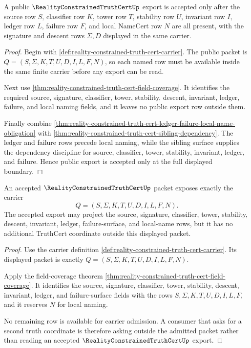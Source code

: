 \begin{theorem}
\label{thm:reality-constrained-truth-cert-public-export-boundary}
A public $\RealityConstrainedTruthCertUp$ export is accepted only after the source row $S$, classifier row $K$, tower row $T$, stability row $U$, invariant row $I$, ledger row $L$, failure row $F$, and local NameCert row $N$ are all present, with the signature and descent rows $\Sigma,D$ displayed in the same carrier.
\end{theorem}
\begin{proof}
Begin with \autoref{def:reality-constrained-truth-cert-carrier}. The public packet is $Q=(S,\Sigma,K,T,U,D,I,L,F,N)$, so each named row must be available inside the same finite carrier before any export can be read.

Next use \autoref{thm:reality-constrained-truth-cert-field-coverage}. It identifies the required source, signature, classifier, tower, stability, descent, invariant, ledger, failure, and local naming fields, and it leaves no public export row outside them.

Finally combine \autoref{thm:reality-constrained-truth-cert-ledger-failure-local-name-obligation} with \autoref{thm:reality-constrained-truth-cert-sibling-dependency}. The ledger and failure rows precede local naming, while the sibling surface supplies the dependency discipline for source, classifier, tower, stability, invariant, ledger, and failure. Hence public export is accepted only at the full displayed boundary.
\end{proof}

\begin{theorem}
\label{thm:reality-constrained-truth-cert-carrier-admission}
An accepted $\RealityConstrainedTruthCertUp$ packet exposes exactly the carrier
$$
Q=(S,\Sigma,K,T,U,D,I,L,F,N).
$$
The accepted export may project the source, signature, classifier, tower,
stability, descent, invariant, ledger, failure-surface, and local-name rows,
but it has no additional TruthCert coordinate outside this displayed packet.
\end{theorem}
\begin{proof}
Use the carrier definition
\autoref{def:reality-constrained-truth-cert-carrier}. Its displayed packet is
exactly $Q=(S,\Sigma,K,T,U,D,I,L,F,N)$.

Apply the field-coverage theorem
\autoref{thm:reality-constrained-truth-cert-field-coverage}. It identifies the
source, signature, classifier, tower, stability, descent, invariant, ledger,
and failure-surface fields with the rows $S,\Sigma,K,T,U,D,I,L,F$, and it
reserves $N$ for local naming.

No remaining row is available for carrier admission. A consumer that asks for a
second truth coordinate is therefore asking outside the admitted packet rather
than reading an accepted $\RealityConstrainedTruthCertUp$ export.
\end{proof}

